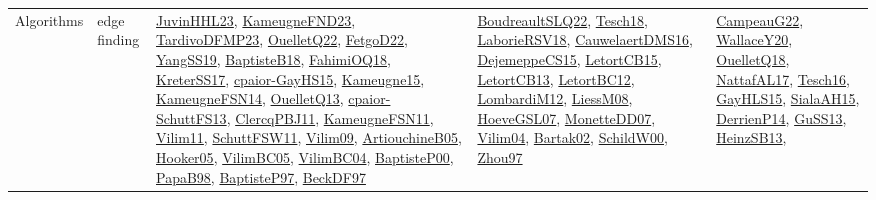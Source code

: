 {\begin{longtable}{lp{3cm}>{\raggedright}p{6cm}>{\raggedright}p{6cm}p{8cm}}
Algorithms & edge finding & \href{papers/JuvinHHL23.pdf}{JuvinHHL23}\cite{JuvinHHL23}, \href{papers/KameugneFND23.pdf}{KameugneFND23}\cite{KameugneFND23}, \href{papers/TardivoDFMP23.pdf}{TardivoDFMP23}\cite{TardivoDFMP23}, \href{papers/OuelletQ22.pdf}{OuelletQ22}\cite{OuelletQ22}, \href{articles/FetgoD22.pdf}{FetgoD22}\cite{FetgoD22}, \href{papers/YangSS19.pdf}{YangSS19}\cite{YangSS19}, \href{articles/BaptisteB18.pdf}{BaptisteB18}\cite{BaptisteB18}, \href{articles/FahimiOQ18.pdf}{FahimiOQ18}\cite{FahimiOQ18}, \href{articles/KreterSS17.pdf}{KreterSS17}\cite{KreterSS17}, \href{papers/cpaior-GayHS15.pdf}{cpaior-GayHS15}\cite{cpaior-GayHS15}, \href{articles/Kameugne15.pdf}{Kameugne15}\cite{Kameugne15}, \href{articles/KameugneFSN14.pdf}{KameugneFSN14}\cite{KameugneFSN14}, \href{papers/OuelletQ13.pdf}{OuelletQ13}\cite{OuelletQ13}, \href{papers/cpaior-SchuttFS13.pdf}{cpaior-SchuttFS13}\cite{cpaior-SchuttFS13}, \href{papers/ClercqPBJ11.pdf}{ClercqPBJ11}\cite{ClercqPBJ11}, \href{papers/KameugneFSN11.pdf}{KameugneFSN11}\cite{KameugneFSN11}, \href{papers/Vilim11.pdf}{Vilim11}\cite{Vilim11}, \href{articles/SchuttFSW11.pdf}{SchuttFSW11}\cite{SchuttFSW11}, \href{papers/Vilim09.pdf}{Vilim09}\cite{Vilim09}, \href{papers/ArtiouchineB05.pdf}{ArtiouchineB05}\cite{ArtiouchineB05}, \href{articles/Hooker05.pdf}{Hooker05}\cite{Hooker05}, \href{articles/VilimBC05.pdf}{VilimBC05}\cite{VilimBC05}, \href{papers/VilimBC04.pdf}{VilimBC04}\cite{VilimBC04}, \href{articles/BaptisteP00.pdf}{BaptisteP00}\cite{BaptisteP00}, \href{articles/PapaB98.pdf}{PapaB98}\cite{PapaB98}, \href{papers/BaptisteP97.pdf}{BaptisteP97}\cite{BaptisteP97}, \href{papers/BeckDF97.pdf}{BeckDF97}\cite{BeckDF97} & \href{papers/BoudreaultSLQ22.pdf}{BoudreaultSLQ22}\cite{BoudreaultSLQ22}, \href{papers/Tesch18.pdf}{Tesch18}\cite{Tesch18}, \href{articles/LaborieRSV18.pdf}{LaborieRSV18}\cite{LaborieRSV18}, \href{papers/CauwelaertDMS16.pdf}{CauwelaertDMS16}\cite{CauwelaertDMS16}, \href{papers/DejemeppeCS15.pdf}{DejemeppeCS15}\cite{DejemeppeCS15}, \href{articles/LetortCB15.pdf}{LetortCB15}\cite{LetortCB15}, \href{papers/LetortCB13.pdf}{LetortCB13}\cite{LetortCB13}, \href{papers/LetortBC12.pdf}{LetortBC12}\cite{LetortBC12}, \href{articles/LombardiM12.pdf}{LombardiM12}\cite{LombardiM12}, \href{articles/LiessM08.pdf}{LiessM08}\cite{LiessM08}, \href{papers/HoeveGSL07.pdf}{HoeveGSL07}\cite{HoeveGSL07}, \href{papers/MonetteDD07.pdf}{MonetteDD07}\cite{MonetteDD07}, \href{papers/Vilim04.pdf}{Vilim04}\cite{Vilim04}, \href{papers/Bartak02.pdf}{Bartak02}\cite{Bartak02}, \href{articles/SchildW00.pdf}{SchildW00}\cite{SchildW00}, \href{articles/Zhou97.pdf}{Zhou97}\cite{Zhou97} & \href{articles/CampeauG22.pdf}{CampeauG22}\cite{CampeauG22}, \href{articles/WallaceY20.pdf}{WallaceY20}\cite{WallaceY20}, \href{papers/OuelletQ18.pdf}{OuelletQ18}\cite{OuelletQ18}, \href{articles/NattafAL17.pdf}{NattafAL17}\cite{NattafAL17}, \href{papers/Tesch16.pdf}{Tesch16}\cite{Tesch16}, \href{papers/GayHLS15.pdf}{GayHLS15}\cite{GayHLS15}, \href{papers/SialaAH15.pdf}{SialaAH15}\cite{SialaAH15}, \href{papers/DerrienP14.pdf}{DerrienP14}\cite{DerrienP14}, \href{papers/GuSS13.pdf}{GuSS13}\cite{GuSS13}, \href{articles/HeinzSB13.pdf}{HeinzSB13}\cite{HeinzSB13}, 
\end{longtable}}
